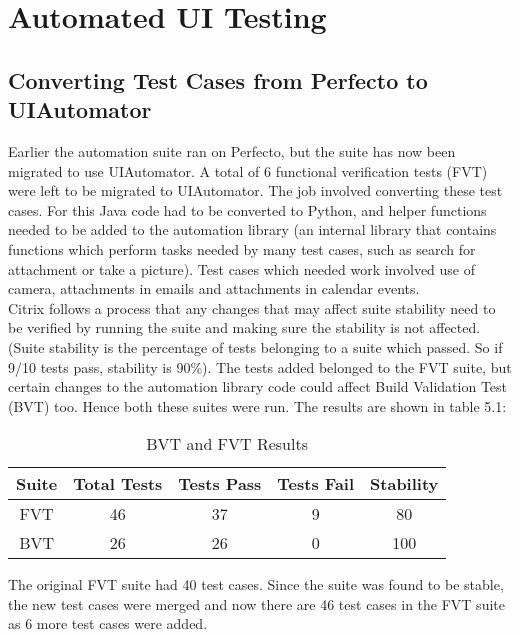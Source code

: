 \setlength\parindent{0pt}

\chapter{Automated UI Testing}

\section{Converting Test Cases from Perfecto to UIAutomator}
Earlier the automation suite ran on Perfecto, but the suite has now been migrated to use UIAutomator. A total of 6 functional verification tests (FVT) were left to be migrated to UIAutomator. The job involved converting these test cases. For this Java code had to be converted to Python, and helper functions needed to be added to the automation library (an internal library that contains functions which perform tasks needed by many test cases, such as search for attachment or take a picture). Test cases which needed work involved use of camera, attachments in emails and attachments in calendar events. \\

Citrix follows a process that any changes that may affect suite stability need to be verified by running the suite and making sure the stability is not affected. (Suite stability is the percentage of tests belonging to a suite which passed. So if 9/10 tests pass, stability is 90\%). The tests added belonged to the FVT suite, but certain changes to the automation library code could affect Build Validation Test (BVT) too. Hence both these suites were run. The results are shown in table 5.1:

\begin{table}[!h]
\centering
\caption{BVT and FVT Results}
\begin{tabular}{|c|c|c|c|c|}
\hline
Suite & Total Tests & Tests Pass & Tests Fail & Stability \\ \hline
FVT   & 46          & 37         & 9          & 80        \\ \hline
BVT   & 26          & 26         & 0          & 100       \\ \hline         
\end{tabular}
\end{table} 

The original FVT suite had 40 test cases. Since the suite was found to be stable, the new test cases were merged and now there are 46 test cases in the FVT suite as 6 more test cases were added.

